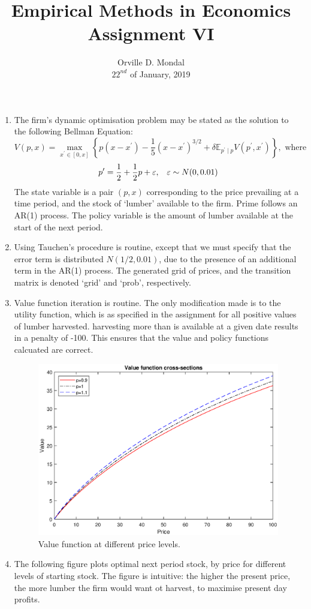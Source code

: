 \documentclass[12pt,a4paper]{article}
\title{Empirical Methods in Economics\\\small{Assignment VI}\vspace{-9ex}}
\date{Orville D. Mondal\\ $22^{nd}$ of January, 2019\vspace{-3ex}}
\newcommand{\E}{\mathbb{E}}
\begin{document}
\maketitle
\begin{enumerate}[1.]
\item The firm's dynamic optimisation problem may be stated as the solution to the following Bellman Equation:
\[V(p,x)=\max_{x^\prime\in[0,x]}\left\{p(x-x^\prime)-\frac{1}{5}(x-x^\prime)^{3/2}+\delta\E_{p^\prime\mid p}V(p^\prime,x^\prime)\right\},\text{ where }\]
\[p^\prime=\frac{1}{2}+\frac{1}{2}p+\varepsilon,\hspace{3mm}\varepsilon\sim N(0,0.01)\]
The state variable is a pair $(p,x)$ corresponding to the price prevailing at a time period, and the stock of `lumber' available to the firm. Prime follows an AR(1) process. The policy variable is the amount of lumber available at the start of the next period. 
\item Using Tauchen's procedure is routine, except that we must specify that the error term is distributed $N(1/2,0.01)$, due to the presence of an additional term in the AR(1) process. The generated grid of prices, and the transition matrix is denoted `grid' and `prob', respectively. 
\item Value function iteration is routine. The only modification made is to the utility function, which is as specified in the assignment for all positive values of lumber harvested. harvesting more than is available at a given date results in a penalty of -100. This ensures that the value and policy functions calcuated are correct.  
\begin{figure}[h]
\includegraphics[width=\textwidth]{value.eps}\vspace{-3ex}
\caption{Value function at different price levels.}
\end{figure}
\item The following figure plots optimal next period stock, by price for different levels of starting stock. The figure is intuitive: the higher the present price, the more lumber the firm would want ot harvest, to maximise present day profits. 


\end{enumerate}
\end{document}
